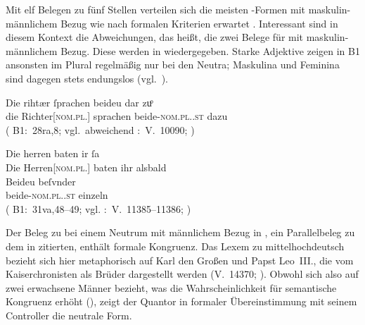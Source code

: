 Mit elf Belegen zu fünf Stellen verteilen sich die meisten
-Formen mit maskulin-männlichem Bezug wie nach formalen Kriterien
erwartet \autocites(siehe auch )[vgl.][182]{ksw2}.
Interessant sind in diesem Kontext die Abweichungen, das heißt,
die zwei Belege für  mit maskulin-männlichem Bezug. Diese werden
in  wiedergegeben. Starke Adjektive
zeigen in B1 ansonsten  im Plural regel\-mäßig nur bei den Neutra;
Maskulina und Feminina sind dagegen stets endungslos
(vgl.~).

\begin{exe}
\ex \label{ex:richtherriu}
	\begin{xlist}
	\ex \gll Die rihtær ſprachen beideu {dar zuͦ} \\
			die Richter[\textsc{nom.pl.\MascM}] sprachen beide-\textsc{nom.pl.\NeutM.st}
			dazu \\
		\trans {}
			(%
				B1:~28ra,8; vgl.~abweichend
				\KC:~V.~10090;
				\cite[267]{schroeder1895}%
			)
		\label{ex:richtherriu_1}

	\ex \gll Die herren baten ir ſa \\
			Die Herren[\textsc{nom.pl.\MascM}] baten ihr alsbald \\
	\sn \gll Beideu beſvnder \\
			beide-\textsc{nom.pl.\NeutM.st} einzeln \\
		\trans {}
			(%
				B1:~31va,48--49; vgl.
				\KC:~V.~11385--11386;
				\cite[289]{schroeder1895}%
			)
		\label{ex:richtherriu_2}
	\end{xlist}
\end{exe}

\label{phsec:baideuwarn}
Der Beleg zu  bei einem Neutrum mit männlichem Bezug in
, ein Parallelbeleg zu dem in
 zitierten, enthält formale
Kongruenz. Das Lexem
  zu mittelhochdeutsch  
\autocites[s.\,v.~]{mwb1}[vgl.~auch][53]{kroonen2013} bezieht sich
hier metaphorisch auf Karl den Großen und Papst Leo~III., die vom
Kaiserchronisten als Brüder dargestellt werden (V.~14370;
\cites[341]{schroeder1895}[vgl.][83]{weis2022}). Obwohl sich  also
auf zwei erwachsene Männer bezieht, was die Wahrscheinlichkeit für semantische
Kongruenz erhöht (), zeigt der Quantor in formaler
Übereinstimmung mit seinem Controller die neutrale Form.

